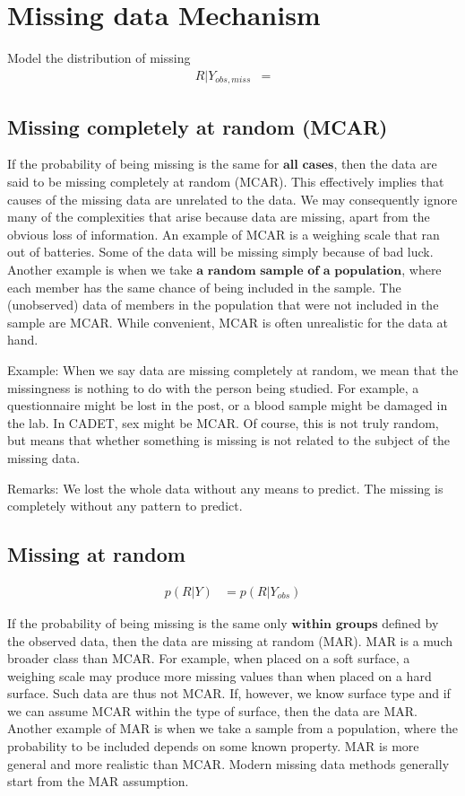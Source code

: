 \section{Missing data Mechanism}
 Model the distribution of missing
\begin{align*}
	R |Y_{obs, miss} &= 
\end{align*}

\subsection{Missing completely at random (MCAR)}

If the probability of being missing is the same for $\textbf{all cases}$, then the data are said to be missing completely at random (MCAR). This effectively implies that causes of the missing data are unrelated to the data. We may consequently ignore many of the complexities that arise because data are missing, apart from the obvious loss of information. An example of MCAR is a weighing scale that ran out of batteries. Some of the data will be missing simply because of bad luck. Another example is when we take $ \textbf{a random sample of a population}$, where each member has the same chance of being included in the sample. The (unobserved) data of members in the population that were not included in the sample are MCAR. While convenient, MCAR is often unrealistic for the data at hand.

Example: When we say data are missing completely at random, we mean that the missingness is nothing to do with the person being studied. For example, a questionnaire might be lost in the post, or a blood sample might be damaged in the lab. In CADET, sex might be MCAR. Of course, this is not truly random, but means that whether something is missing is not related to the subject of the missing data.

Remarks:
We lost the whole data without any means to predict. The missing is completely without any pattern to predict.

\subsection{Missing at random}

\begin{align*}
	p(R | Y ) &= p(R | Y_{obs})
\end{align*}

If the probability of being missing is the same only $\textbf{within groups}$ defined by the observed data, then the data are missing at random (MAR). MAR is a much broader class than MCAR. For example, when placed on a soft surface, a weighing scale may produce more missing values than when placed on a hard surface. Such data are thus not MCAR. If, however, we know surface type and if we can assume MCAR within the type of surface, then the data are MAR. Another example of MAR is when we take a sample from a population, where the probability to be included depends on some known property. MAR is more general and more realistic than MCAR. Modern missing data methods generally start from the MAR assumption.

